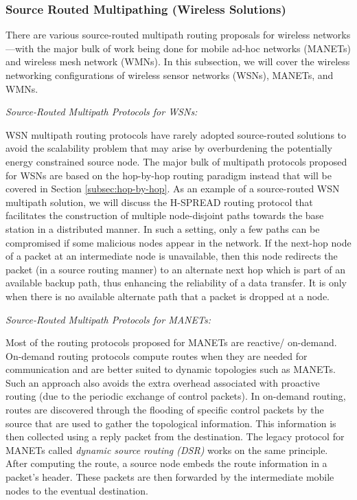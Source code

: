 \documentclass[10pt]{IEEEtran}
\begin{document}
\vspace{2mm}
\subsubsection{Source Routed Multipathing (Wireless Solutions)}
\label{subsub:wireless_source_routing}

There are various source-routed multipath routing proposals for wireless networks---with the major bulk of work being done for mobile ad-hoc networks (MANETs) and wireless mesh network (WMNs). In this subsection, we will cover the wireless networking configurations of wireless sensor networks (WSNs), MANETs, and WMNs.

\vspace{2mm}
\textit{Source-Routed Multipath Protocols for WSNs:}
\vspace{1mm}


WSN multipath routing protocols have rarely adopted source-routed solutions to avoid the scalability problem that may arise by overburdening 
the potentially energy constrained source node. The major bulk of multipath protocols proposed for WSNs are based on the hop-by-hop routing paradigm instead that will be covered in Section \ref{subsec:hop-by-hop}. As an example of a source-routed WSN multipath solution, we will discuss the H-SPREAD \cite{lou2006h} routing protocol that facilitates the construction of multiple node-disjoint paths towards the base station in a distributed manner. In such a setting, only a few paths can be compromised if some malicious nodes appear in the network. If the next-hop node of a packet at an intermediate node is unavailable, then this node redirects the packet (in a source routing manner) to an alternate next hop which is part of an available backup path, thus enhancing the reliability of a data transfer. It is only when there is no available alternate path that a packet is dropped at a node.

\vspace{2mm}
\textit{Source-Routed Multipath Protocols for MANETs:}
\vspace{1mm}


Most of the routing protocols proposed for MANETs are reactive/ on-demand. On-demand routing protocols compute routes when they are needed for communication and are better suited to dynamic topologies such as MANETs. Such an approach also avoids the extra overhead associated with proactive routing (due to the periodic exchange of control packets). In on-demand routing, routes are discovered through the flooding of specific control packets by the source that are used to gather the topological information. This information is then collected using a reply packet from the destination. The legacy protocol for MANETs called  \textit{dynamic source routing (DSR)} \cite{johnson1996dynamic} works on the same principle. After computing the route, a source node embeds the route information in a packet's header. These packets are then forwarded by the intermediate mobile nodes to the eventual destination.
\end{document}
